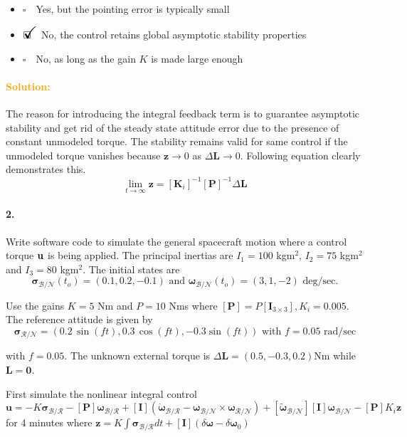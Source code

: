 \documentclass[12pt, a4paper]{article}
\newcommand{\ans}{\item[]$\rlap{\LARGE{\checkmark}}\square\quad$}
\newcommand{\noans}{\item[]$\square\quad$}
\begin{document}
\begin{itemize}
\noans Yes, but the pointing error is typically small
\ans No, the control retains global asymptotic stability properties
\noans No, as long as the gain $K$ is made large enough  
\end{itemize}

\paragraph{\textcolor{orange}{Solution:}} The reason for introducing the integral feedback term is to guarantee asymptotic stability and get rid of the steady state attitude error due to the presence of constant unmodeled torque. The stability remains valid for same control if the unmodeled torque vanishes because $\bm{z}\rightarrow0$ as $\Delta\bm{L}\rightarrow0$. Following equation clearly demonstrates this.
$$
\lim_{t\rightarrow\infty}\bm{z} = [\bm{K}_{i}]^{-1}[\bm{P}]^{-1}\Delta\bm{L}
$$

\paragraph{2.}
Write software code to simulate the general spacecraft motion where a control torque $\bf{u}$ is being applied. The principal inertias are $I_{1} = 100$ kgm$^{2}$, $I_{2} = 75$ kgm$^{2}$ and $I_{3} = 80$ kgm$^{2}$. The initial states are
$$\bm{\sigma}_{\mathcal{B}/\mathcal{N}}(t_{o}) = (0.1,0.2,-0.1)\text{ and }\bm{\omega}_{\mathcal{B}/\mathcal{N}}(t_{o}) = (3,1,-2) \text{ deg/sec.}$$

Use the gains $K = 5$ Nm and $P = 10$ Nms where $[\bm{P}] = P [\bm{I}_{3\times3}], K_{i} = 0.005$. The reference attitude is given by
$$\bm{\sigma}_{\mathcal{R}/\mathcal{N}} = \left(0.2\,\sin(ft),0.3\,\cos(ft),-0.3\sin(ft)\right)\text{ with }f = 0.05 \text{ rad/sec}$$

with $f=0.05$. The unknown external torque is $\Delta\bm{L} = (0.5,-0.3,0.2)$Nm while $\bm{L}=\bm{0}$.

First simulate the nonlinear integral control 
$$
\bm{u} = -K\bm{\sigma}_{\mathcal{B}/\mathcal{R}} - [\bm{P}]\bm{\omega}_{\mathcal{B}/\mathcal{R}} + [\bm{I}]\left(\dot{\bm{\omega}}_{\mathcal{B}/\mathcal{R}} - \bm{\omega}_{\mathcal{B}/\mathcal{N}} \times \bm{\omega}_{\mathcal{R}/\mathcal{N}} \right) + [\tilde{\bm{\omega}}_{\mathcal{B}/\mathcal{N}}][\bm{I}]\bm{\omega}_{\mathcal{B}/\mathcal{N}}-[\bm{P}]K_{i}\bm{z}
$$
for 4 minutes where $\bm{z} = K\int\bm{\sigma}_{\mathcal{B}/\mathcal{R}}dt+[\bm{I}](\delta\bm{\omega}-\delta\bm{\omega}_{0})$
\end{document}
